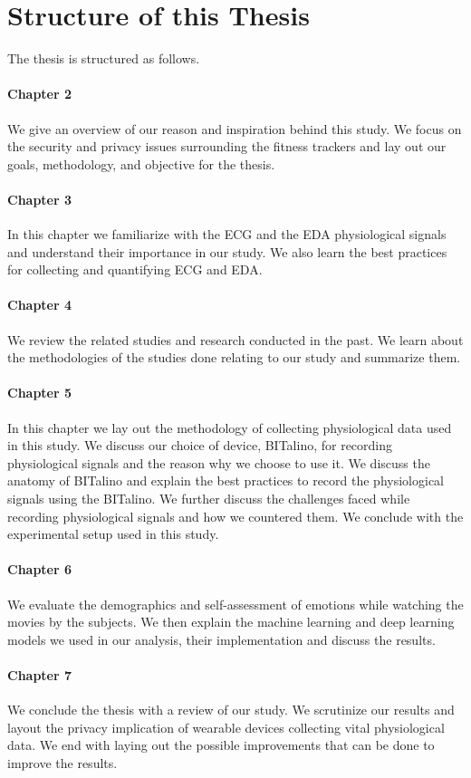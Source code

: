 \section{Structure of this Thesis}
The thesis is structured as follows.
\paragraph{Chapter 2} We give an overview of our reason and inspiration behind this study. We focus on the security and privacy issues surrounding the fitness trackers and lay out our goals, methodology, and objective for the thesis.
\paragraph{Chapter 3} In this chapter we familiarize with the ECG and the EDA physiological signals and understand their importance in our study. We also learn the best practices for collecting and quantifying ECG and EDA.
\paragraph{Chapter 4} We review the related studies and research conducted in the past. We learn about the methodologies of the studies done relating to our study and summarize them.

\paragraph{Chapter 5} In this chapter we lay out the methodology of collecting physiological data used in this study. We discuss our choice of device, BITalino, for recording physiological signals and the reason why we choose to use it. We discuss the anatomy of BITalino and explain the best practices to record the physiological signals using the BITalino. We further discuss the challenges faced while recording physiological signals and how we countered them. We conclude with the experimental setup used in this study.

\paragraph{Chapter 6} We evaluate the demographics and self-assessment of emotions while watching the movies by the subjects. We then explain the machine learning and deep learning models we used in our analysis, their implementation and discuss the results.

\paragraph{Chapter 7} We conclude the thesis with a review of our study. We scrutinize our results and layout the privacy implication of wearable devices collecting vital physiological data. We end with laying out the possible improvements that can be done to improve the results. 
